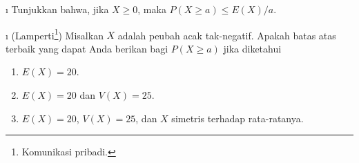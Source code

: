 {\begin{LJSItem}
\i\label{exer 8.2.111} Tunjukkan bahwa, jika $X \geq 0$, maka $P(X \geq a) \leq E(X)/a$.

\i\label{exer 8.2.112} (Lamperti\footnote{Komunikasi pribadi.})
 Misalkan $X$ adalah peubah acak tak-negatif.
Apakah batas atas terbaik yang dapat Anda berikan bagi $P(X \geq a)$ jika diketahui
\begin{enumerate}
\item $E(X) = 20$.

\item $E(X) = 20$ dan $V(X) = 25$.

\item $E(X) = 20$, $V(X) = 25$, dan $X$ simetris terhadap rata-ratanya.
\end{enumerate}
\end{LJSItem}}
